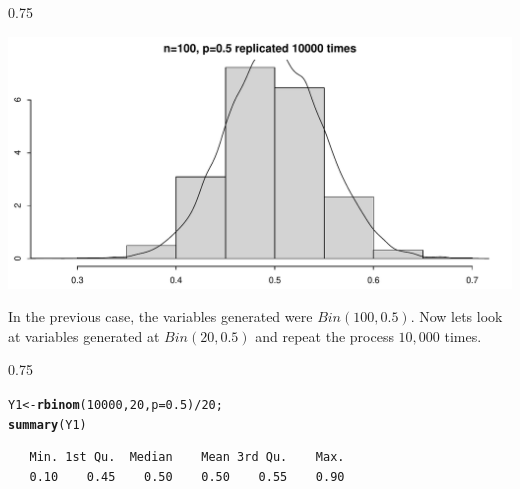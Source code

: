 \documentclass{beamer}\usepackage[]{graphicx}\usepackage[]{color}
\makeatletter
\newcommand{\hlnum}[1]{\textcolor[rgb]{0.2,0.2,0.2}{#1}}%
\newcommand{\hlopt}[1]{\textcolor[rgb]{0.102,0.102,0.102}{#1}}%
\newcommand{\hlstd}[1]{\textcolor[rgb]{0.102,0.102,0.102}{#1}}%
\newcommand{\hlkwb}[1]{\textcolor[rgb]{0.102,0.102,0.102}{#1}}%
\newcommand{\hlkwc}[1]{\textcolor[rgb]{0.2,0.2,0.2}{#1}}%
\newcommand{\hlkwd}[1]{\textcolor[rgb]{0.102,0.102,0.102}{\textbf{#1}}}%
\newenvironment{kframe}{%
 \def\at@end@of@kframe{}%
 \ifinner\ifhmode%
  \def\at@end@of@kframe{\end{minipage}}%
  \begin{minipage}{\columnwidth}%
 \fi\fi%
 \def\FrameCommand##1{\hskip\@totalleftmargin \hskip-\fboxsep
 \colorbox{shadecolor}{##1}\hskip-\fboxsep
     \hskip-\linewidth \hskip-\@totalleftmargin \hskip\columnwidth}%
 \MakeFramed {\advance\hsize-\width
   \@totalleftmargin\z@ \linewidth\hsize
   \@setminipage}}%
 {\par\unskip\endMakeFramed%
 \at@end@of@kframe}
\newenvironment{knitrout}{}{} %
\renewenvironment{knitrout}{\begin{spacing}{0.75}\begin{tiny}}{\end{tiny}\end{spacing}}
\makeatother
\begin{document}
\begin{frame}[fragile]

\begin{knitrout}\small
{}\color{fgcolor}

{\centering \includegraphics[width=0.89\linewidth]{figure/graphics-unnamed-chunk-13-1} 

}



\end{knitrout}

\end{frame}

\begin{frame}[fragile]

In the previous case, the variables generated were $Bin(100,0.5)$. Now lets look at variables generated at $Bin(20,0.5)$ and repeat the process $10,000$ times.

\begin{knitrout}\small
{}\color{fgcolor}\begin{kframe}
\begin{alltt}
\hlstd{Y1} \hlkwb{<-} \hlkwd{rbinom}\hlstd{(}\hlnum{10000}\hlstd{,} \hlnum{20}\hlstd{,} \hlkwc{p}\hlstd{=}\hlnum{0.5}\hlstd{)}\hlopt{/} \hlnum{20}\hlstd{;}
\hlkwd{summary}\hlstd{(Y1)}
\end{alltt}
\begin{verbatim}
   Min. 1st Qu.  Median    Mean 3rd Qu.    Max. 
   0.10    0.45    0.50    0.50    0.55    0.90 
\end{verbatim}
\end{kframe}
\end{knitrout}

\end{frame}
\end{document}
